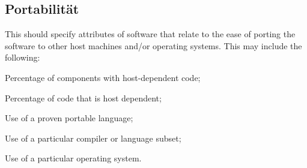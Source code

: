 	\subsection{Portabilität}
		This should specify attributes of software that relate to the ease of porting the software to other host machines and/or operating systems. This may include the following:
		
		Percentage of components with host-dependent code;
		
		Percentage of code that is host dependent;
		
		Use of a proven portable language; 
		
		Use of a particular compiler or language subset;
		
		Use of a particular operating system.

